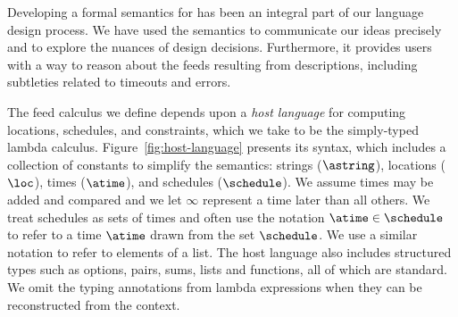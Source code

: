 Developing a formal semantics for \padsd{} has been an
integral part of our language design process.  We have used the semantics to
communicate our ideas precisely and to explore the nuances of design
decisions. Furthermore, it provides users with a way to reason about the feeds
resulting from \padsd{} descriptions, including subtleties related to
timeouts and errors.

The feed calculus we define depends upon a {\em host language} for
computing locations, schedules, and constraints, which we take to be
the simply-typed lambda calculus.  Figure~\ref{fig:host-language}
presents its syntax, which includes a collection of constants to
simplify the semantics: strings ($\astring$), locations ($\loc$),
times ($\atime$), and schedules ($\schedule$).  We assume times may be
added and compared and we let $\infty$ represent a time later than all
others.  We treat schedules as sets of times and often use the
notation $\atime \in \schedule$ to refer to a time $\atime$ drawn from
the set $\schedule$.  We use a similar notation to refer to elements
of a list.  The host language also includes structured types such as
options, pairs, sums, lists and functions, all of which are standard.
We omit the typing annotations from lambda expressions when they
can be reconstructed from the context.

